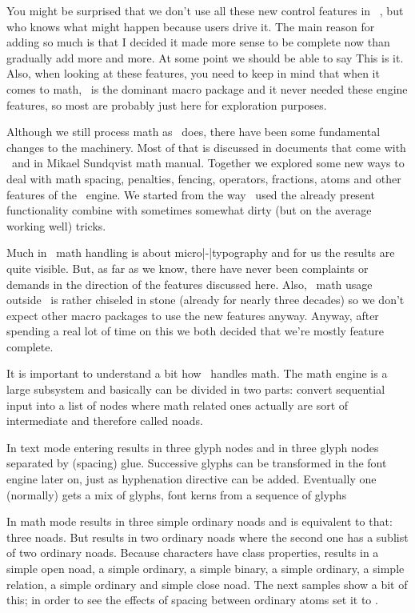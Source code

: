 You might be surprised that we don't use all these new control features in
\CONTEXT\ \LMTX, but who knows what might happen because users drive it. The main
reason for adding so much is that I decided it made more sense to be complete now
than gradually add more and more. At some point we should be able to say \quote
{This is it}. Also, when looking at these features, you need to keep in mind that
when it comes to math, \LATEX\ is the dominant macro package and it never needed
these engine features, so most are probably just here for exploration purposes.
\stopquotation

Although we still process math as \TEX\ does, there have been some fundamental
changes to the machinery. Most of that is discussed in documents that come with
\CONTEXT\ and in Mikael Sundqvist math manual. Together we explored some new ways
to deal with math spacing, penalties, fencing, operators, fractions, atoms and
other features of the \TEX\ engine. We started from the way \CONTEXT\ used the
already present functionality combine with sometimes somewhat dirty (but on the
average working well) tricks.

Much in \LUAMETATEX\ math handling is about micro|-|typography and for us the
results are quite visible. But, as far as we know, there have never been
complaints or demands in the direction of the features discussed here. Also,
\TEX\ math usage outside \CONTEXT\ is rather chiseled in stone (already for
nearly three decades) so we don't expect other macro packages to use the new
features anyway. Anyway, after spending a real lot of time on this we both
decided that we're mostly feature complete.

\stopsection

\startsection[title=Intermezzo]

It is important to understand a bit how \TEX\ handles math. The math engine
is a large subsystem and basically can be divided in two parts: convert
sequential input into a list of nodes where math related ones actually are
sort of intermediate and therefore called noads.

In text mode entering  results in three glyph nodes and  in three glyph nodes separated by (spacing) glue. Successive glyphs can be
transformed in the font engine later on, just as hyphenation directive can
be added. Eventually one (normally) gets a mix of glyphs, font kerns from
a sequence of glyphs

In math mode  results in three simple ordinary noads and 
is equivalent to that: three noads. But  results in two ordinary
noads where the second one has a sublist of two ordinary noads. Because
characters have class properties,  results in a simple open
noad, a simple ordinary, a simple binary, a simple ordinary, a simple relation, a
simple ordinary and simple close noad. The next samples show a bit of this; in
order to see the effects of spacing between ordinary atoms set it to \type {9mu}.

